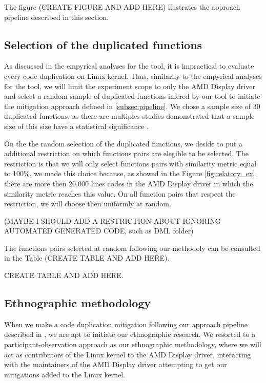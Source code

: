 The figure (CREATE FIGURE AND ADD HERE) ilustrates the approach pipeline described in this section.

\subsection{Selection of the duplicated functions}

As discussed in the empyrical analyses for the tool, it is impractical to evaluate every code duplication on Linux kernel. Thus,
similarily to the empyrical analyses for the tool, we will limit the experiment scope to only the AMD Display driver and select
a random sample of duplicated functions infered by our tool to initiate the mitigation approach defined in \ref{subsec:pipeline}. 
We chose a sample size of 30 duplicated functions, as there are multiples studies demonstrated that a sample size of this size 
have a statistical significance \citep{sample1,sample2}.

On the the random selection of the duplicated functions, we deside to put a additional restriction on which functions pairs are 
elegible to be selected. The restriction is that we will only select functions pairs with similarity metric equal 
to 100\%, we made this choice because, as showed in the Figure \ref{fig:relatory_ex}, there are more then 20,000 lines codes 
in the AMD Display driver in which the similarity metric reaches this value. On all function pairs that respect the restriction,
we will choose then uniformly at random.

(MAYBE I SHOULD ADD A RESTRICTION ABOUT IGNORING AUTOMATED GENERATED CODE, such as DML folder)

The functions pairs selected at random following our methodoly can be consulted in the Table (CREATE TABLE AND ADD HERE).

CREATE TABLE AND ADD HERE.

\subsection{Ethnographic methodology}

When we make a code duplication mitigation following our approach pipeline described in \citep{subsec:pipeline}, we are apt
to initiate our ethnographic research. We resorted to a participant-observation approach as our ethnographic methodology, where we 
will act as contributors of the Linux kernel to the AMD Display driver, interacting with the maintainers of the AMD Display driver
attempting to get our mitigations added to the Linux kernel. 


